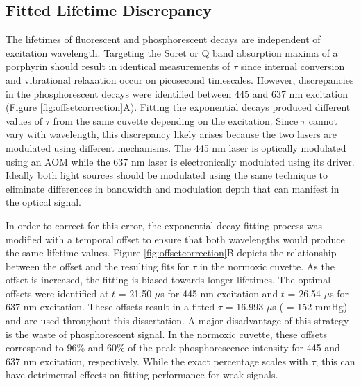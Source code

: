 \subsection{Fitted Lifetime Discrepancy}

The lifetimes of fluorescent and phosphorescent decays are independent of excitation wavelength. Targeting the Soret or Q band absorption maxima of a porphyrin should result in identical measurements of $\tau$ since internal conversion and vibrational relaxation occur on picosecond timescales. However, discrepancies in the phosphorescent decays were identified between 445 and 637 nm excitation (Figure \ref{fig:offsetcorrection}A). Fitting the exponential decays produced different values of $\tau$ from the same cuvette depending on the excitation. Since $\tau$ cannot vary with wavelength, this discrepancy likely arises because the two lasers are modulated using different mechanisms. The 445 nm laser is optically modulated using an AOM while the 637 nm laser is electronically modulated using its driver. Ideally both light sources should be modulated using the same technique to eliminate differences in bandwidth and modulation depth that can manifest in the optical signal.

In order to correct for this error, the exponential decay fitting process was modified with a temporal offset to ensure that both wavelengths would produce the same lifetime values. Figure \ref{fig:offsetcorrection}B depicts the relationship between the offset and the resulting fits for $\tau$ in the normoxic cuvette. As the offset is increased, the fitting is biased towards longer lifetimes. The optimal offsets were identified at $t$ = 21.50 $\mu$s for 445 nm excitation and $t$ = 26.54 $\mu$s for 637 nm excitation. These offsets result in a fitted $\tau$ = 16.993 $\mu$s ( = 152 mmHg) and are used throughout this dissertation. A major disadvantage of this strategy is the waste of phosphorescent signal. In the normoxic cuvette, these offsets correspond to 96\% and 60\% of the peak phosphorescence intensity for 445 and 637 nm excitation, respectively. While the exact percentage scales with $\tau$, this can have detrimental effects on fitting performance for weak signals.


